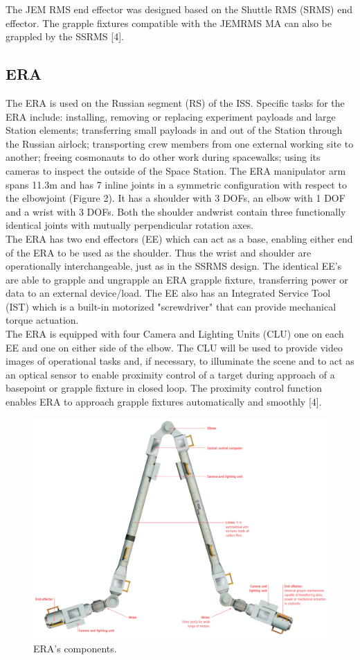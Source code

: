 \documentclass[a4paper,12pt,oneside]{report}
\begin{document}
The JEM RMS end effector was designed based on the Shuttle RMS (SRMS) end effector. The grapple fixtures compatible with the JEMRMS MA can also be grappled by the SSRMS [4].\\
\subsection{ERA}
The ERA is used on the Russian segment (RS) of the ISS. Specific tasks for the ERA include: installing, removing or replacing experiment payloads
and large Station elements; transferring small payloads in and out of the Station through the Russian airlock; transporting crew members from one external working site
to another; freeing cosmonauts to do other work during spacewalks; using its cameras to inspect the outside of the Space Station.
The ERA manipulator arm spans 11.3m and has 7 inline joints in a symmetric configuration with respect to the elbowjoint (Figure 2). It has a shoulder with 3 DOFs, an elbow with 1 DOF and a wrist with 3 DOFs. Both the shoulder andwrist contain three functionally identical joints with mutually perpendicular rotation axes.\\
The ERA has two end effectors (EE) which can act as a base, enabling either end of the ERA to be used as the shoulder. Thus the wrist and shoulder are operationally interchangeable, just as in the SSRMS design. The identical EE’s are able to grapple and ungrapple an ERA grapple fixture, transferring power or data to an external device/load. The EE also has an Integrated Service Tool (IST) which is a built-in motorized "screwdriver" that can provide mechanical torque
actuation.\\
The ERA is equipped with four Camera and Lighting Units (CLU) one on each EE and one on either side of the elbow. The CLU will be used to provide video images of operational tasks and, if necessary, to illuminate the scene and to act as an optical sensor to enable proximity control of a target during approach of a basepoint or grapple fixture in closed loop. The proximity control function enables ERA to approach grapple fixtures automatically and smoothly [4].
\begin{figure}[h]
  \centering
  \includegraphics[scale=0.45]{ERA.png}
  \caption{ERA's components.}
  \label{ERA}
\end{figure}
\end{document}
